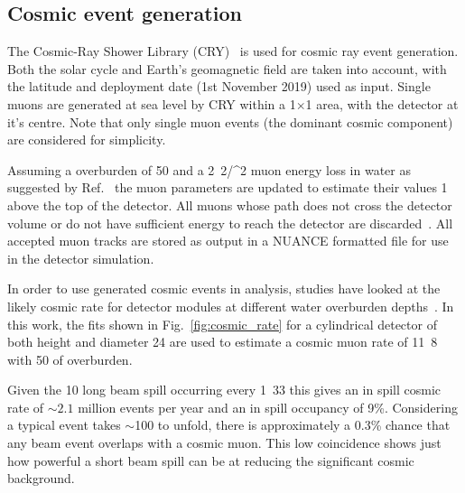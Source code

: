 \subsection{Cosmic event generation} %
\label{sec:chips_monte_carlo_cosmic} %

The Cosmic-Ray Shower Library (CRY)~\cite{hagmann2012_1, hagmann2012_2} is used for cosmic ray
event generation. Both the solar cycle and Earth's geomagnetic field are taken into account, with
the \chipsfive latitude and deployment date (1st November 2019) used as input. Single muons are
generated at sea level by CRY within a \unit{1}{}$\times$\unit{1}{} area,
with the detector at it's centre. Note that only single muon events (the dominant cosmic
component) are considered for simplicity.

Assuming a \chipsfive overburden of \unit{50}{} and a \unit{2.2}{\MeV/^{2}}
muon energy loss in water as suggested by Ref.~\cite{klimushin2001} the muon parameters are
updated to estimate their values \unit{1}{} above the top of the detector. All muons
whose path does not cross the detector volume or do not have sufficient energy to reach the
detector are discarded~\cite{chipsgen2020}. All accepted muon tracks are stored as output in a
NUANCE formatted file for use in the detector simulation.

In order to use generated cosmic events in analysis, studies have looked at the likely cosmic rate
for \chips detector modules at different water overburden depths~\cite{son2013}. In this work, the
fits shown in Fig.~\ref{fig:cosmic_rate} for a cylindrical detector of both height and diameter
\unit{24}{} are used to estimate a \chipsfive cosmic muon rate of
\unit{11.8}{} with \unit{50}{} of overburden.

Given the \unit{10}{\mu{}} long \numi beam spill occurring every \unit{1.33}{}
this gives an in spill cosmic rate of $\sim2.1$ million events per year and an in spill occupancy
of 9\%. Considering a typical event takes $\sim$\unit{100}{} to unfold, there is
approximately a 0.3\% chance that any beam event overlaps with a cosmic muon. This low coincidence
shows just how powerful a short beam spill can be at reducing the significant cosmic background.

